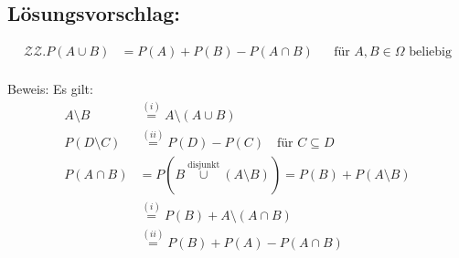 \documentclass[a4paper]{scrartcl}
\begin{document}
\subsection*{Lösungsvorschlag:}
\begin{align*}
    \mathcal{Z}\mathcal{Z}. P(A \cup B) &= P(A) + P(B) - P(A \cap B) && \text{für } A, B \in \Omega \text{ beliebig} \\
\end{align*}

Beweis: Es gilt: \\
\begin{align*}
    A \setminus B &\overset{(i)}{=} A \setminus (A \cup B) \\
    P(D \setminus C) &\overset{(ii)}{=} P(D) - P(C) \quad \text{für } C \subseteq D \\
    P(A \cap B) &= P(B \overset{\text{disjunkt}}{\cup} (A \setminus B)) = P(B) + P(A \setminus B) \\
    &\overset{(i)}{=} P(B) + A \setminus (A \cap B) \\
    &\overset{(ii)}{=} P(B) + P(A) - P(A \cap B)
\end{align*}
\end{document}
